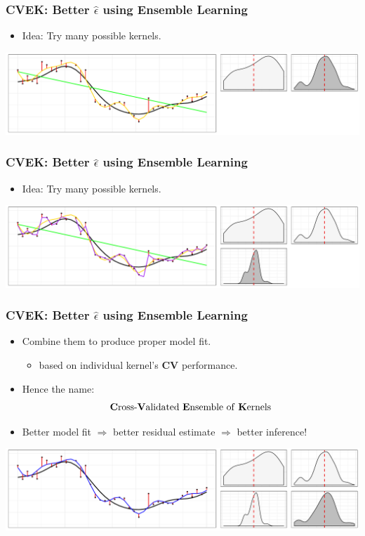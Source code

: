 \documentclass{beamer}
\begin{document}
\begin{frame}
\frametitle{CVEK: Better $\hat{\epsilon}$ using Ensemble Learning}
\begin{itemize}
\item Idea: Try many possible kernels.
\end{itemize}
\vspace{1em}

\includegraphics[width=\linewidth]{./plot/k2} 
\end{frame}

\begin{frame}
\frametitle{CVEK: Better $\hat{\epsilon}$ using Ensemble Learning}
\begin{itemize}
\item Idea: Try many possible kernels.
\end{itemize}
\vspace{1em}

\includegraphics[width=\linewidth]{./plot/k3} 
\end{frame}

\begin{frame}
\frametitle{CVEK: Better $\hat{\epsilon}$ using Ensemble Learning}
\begin{itemize}
\item Combine them to produce proper model fit.
\begin{itemize}
\item based on individual kernel's \textbf{CV} performance.
\end{itemize}
\item Hence the name:
$$\mbox{\textbf{C}ross-\textbf{V}alidated \textbf{E}nsemble of \textbf{K}ernels}$$
\vspace{-.7cm}
\item Better model fit $\Rightarrow$ better residual estimate 
$\Rightarrow$ better inference!
\end{itemize}
\vspace{1em}
\includegraphics[width=0.9\linewidth]{./plot/k4} 
\end{frame}
\end{document}
